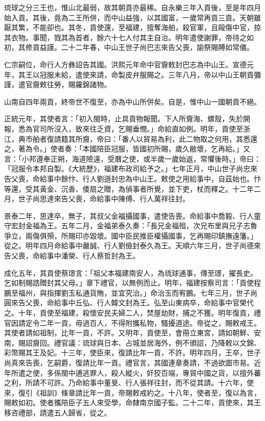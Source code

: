 \begin{pinyinscope}
琉球之分三王也，惟山北最弱，故其朝貢亦最稀。自永樂三年入貢後，至是年四月始入貢。其後，竟為二王所併，而中山益強，以其國富，一歲常再貢三貢。天朝雖厭其繁，不能卻也。其冬，貢使還，至福建，擅奪海舶，殺官軍，且毆傷中官，掠其衣物。事聞，戮其為首者，餘六十七人付其主自治。明年遣使謝罪，帝待之如初，其修貢益謹。二十二年春，中山王世子尚巴志來告父喪，諭祭賜賻如常儀。

仁宗嗣位，命行人方彝詔告其國。洪熙元年命中官齎敕封巴志為中山王。宣德元年，其王以冠服未給，遣使來請，命製皮弁服賜之。三年八月，帝以中山王朝貢彌謹，遣官齎敕往勞，賜羅錦諸物。

山南自四年兩貢，終帝世不復至，亦為中山所併矣。自是，惟中山一國朝貢不絕。

正統元年，其使者言：「初入閩時，止具貢物報聞。下人所齎海、螺殼，失於開報，悉為官司所沒入，致來往乏資，乞賜垂憫。」命給直如例。明年，貢使至浙江，典市舶者復請籍其所齎，帝曰：「番人以貿易為利，此二物取之何用，其悉還之，著為令。」使者奏：「本國陪臣冠服，皆國初所賜，歲久敝壞，乞再給。」又言：「小邦遵奉正朔，海道險遠，受曆之使，或半歲一歲始返，常懼後時。」帝曰：「冠服令本邦自製。《大統歷》，福建布政司給予之。」七年正月，中山世子尚忠來告父喪，命給事中餘忭、行人劉遜封忠為中山王。敕使之用給事中，自茲始也。忭等還，受其黃金、沉香、倭扇之贈，為偵事者所覺，並下吏，杖而釋之。十二年二月，世子尚思達來告父喪，命給事中陳傅、行人萬祥往封。

景泰二年，思達卒，無子，其叔父金福攝國事，遣使告喪。命給事中喬毅、行人童守宏封金福為王。五年二月，金福弟泰久奏：「長兄金福殂，次兄布里與兄子志魯爭立，兩傷俱殞，所賜印亦毀壞。國中臣民推臣權攝國事，乞再賜印鎮撫遠籓。」從之。明年四月命給事中嚴誠、行人劉儉封泰久為王。天順六年三月，世子尚德來告父喪，命給事中潘榮、行人蔡哲封為王。

成化五年，其貢使蔡璟言：「祖父本福建南安人，為琉球通事，傳至璟，擢長史。乞如制賜誥贈封其父母。」章下禮官，以無例而止。明年，福建按察司言：「貢使程鵬至福州，與指揮劉玉私通貨賄，並宜究治。」命治玉而宥鵬。七年三月，世子尚圓來告父喪，命給事中丘弘、行人韓文封為王。弘至山東病卒，命給事中官榮代之。十年，貢使至福建，殺懷安民夫婦二人，焚屋劫財，捕之不獲。明年復貢，禮官因請定令二年一貢，毋過百人，不得附攜私物，騷擾道途。帝從之，賜敕戒王。其使者請如祖制，比年一貢，不許。又明年，貢使至，會冊立東宮，請如朝鮮、安南，賜詔齎回。禮官議：琉球與日本、占城並居海外，例不頒詔，乃降敕以文錦、彩幣賜其王及妃。十三年，使臣來，復請比年一貢，不許。明年四月，王卒，世子尚真來告喪，乞嗣爵，復請比年一貢。禮官言，其國連章奏請，不過欲圖市易。近年所遣之使，多係閩中逋逃罪人，殺人縱火，奸狡百端，專貿中國之貨，以擅外蕃之利，所請不可許。乃命給事中董旻、行人張祥往封，而不從其請。十六年，使來，復引《祖訓》條章請比年一貢，帝賜敕戒約之。十八年，使者至，復以為言，賜敕如初。使者攜陪臣子五人來受學，命隸南京國子監。二十二年，貢使來，其王移咨禮部，請遣五人歸省，從之。


\end{pinyinscope}

